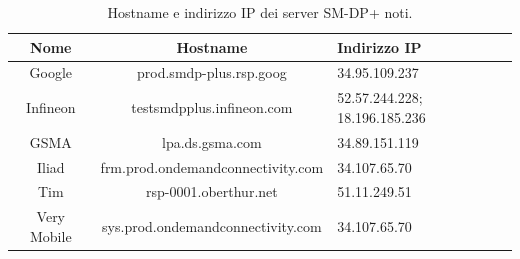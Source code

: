 \documentclass[10pt, oneside]{book}
\begin{document}
\begin{table}[h!]
\begin{center}
\captionsetup{skip=4pt}
\caption{Hostname e indirizzo IP dei server SM-DP+ noti.}
\label{tab:IP-addr}
\begin{tabularx}{\textwidth}{|c|c|X|} %
\hline
\textbf{Nome} & \textbf{Hostname} & \textbf{Indirizzo IP}\\
\hline
Google & prod.smdp-plus.rsp.goog & 34.95.109.237\\
\hline
Infineon & testsmdpplus.infineon.com & 52.57.244.228; 18.196.185.236 \\
\hline
GSMA & lpa.ds.gsma.com & 34.89.151.119\\
\hline
Iliad & frm.prod.ondemandconnectivity.com & 34.107.65.70\\
\hline
Tim & rsp-0001.oberthur.net & 51.11.249.51\\
\hline
Very Mobile & sys.prod.ondemandconnectivity.com & 34.107.65.70\\
\hline
\end{tabularx}
\end{center}
\end{table}
\end{document}
